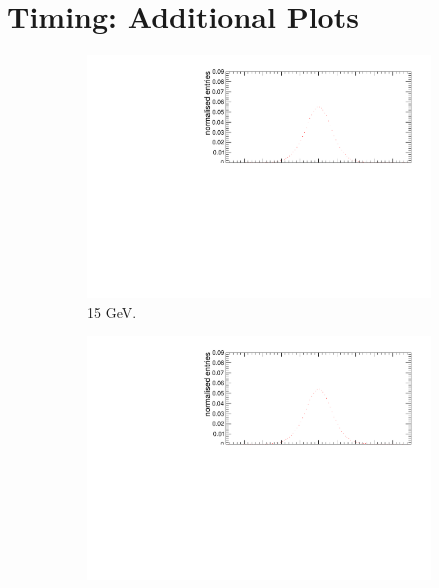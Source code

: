 \chapter{Timing: Additional Plots}
\label{appendix:TimingAdd}

\begin{figure}[htbp!]
  \begin{subfigure}[t]{0.49\textwidth}
    \centering
    \includegraphics[width=1\textwidth]{../Thesis_Plots/Timing/Electrons/Plots/Comparison_SimData_Electrons15GeV.pdf}
    \caption{15 GeV.}\label{fig:elec_sim_data_15GeV}
  \end{subfigure}
  \hfill
  \begin{subfigure}[t]{0.49\textwidth}
    \centering
    \includegraphics[width=1\textwidth]{../Thesis_Plots/Timing/Electrons/Plots/Comparison_SimData_Electrons20GeV.pdf}

\end{subfigure}
\end{figure}
